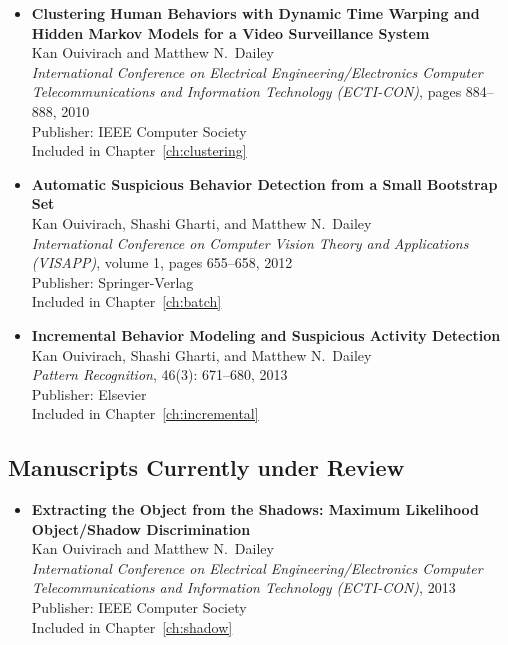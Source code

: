 \begin{itemize}
  \renewcommand\labelitemi{--} 

  \item \textbf{Clustering Human Behaviors with Dynamic Time Warping
    and Hidden Markov Models for a Video Surveillance
    System}\nocite{kan10clustering}\\ Kan Ouivirach and Matthew N.\
    Dailey\\ \textit{International Conference on Electrical
    Engineering/Electronics Computer Telecommunications and
    Information Technology (ECTI-CON)}, pages 884--888, 2010\\
    Publisher: IEEE Computer Society\\ Included in
    Chapter~\ref{ch:clustering}\\

  \item \textbf{Automatic Suspicious Behavior Detection from a Small
    Bootstrap Set}\nocite{kan12detection}\\ Kan Ouivirach, Shashi
    Gharti, and Matthew N.\ Dailey\\ \textit{International Conference
    on Computer Vision Theory and Applications (VISAPP)}, volume 1,
    pages 655--658, 2012\\ Publisher: Springer-Verlag\\ Included in
    Chapter~\ref{ch:batch}\\

  \item \textbf{Incremental Behavior Modeling and Suspicious Activity
    Detection}\nocite{kan13incremental}\\ Kan Ouivirach, Shashi
    Gharti, and Matthew N.\ Dailey\\ \textit{Pattern Recognition},
    46(3): 671--680, 2013\\ Publisher: Elsevier\\ Included in
    Chapter~\ref{ch:incremental}
  
\end{itemize}

\subsection*{Manuscripts Currently under Review}

\begin{itemize}
  \renewcommand\labelitemi{--}

  \item {\bf{Extracting the Object from the Shadows: Maximum
    Likelihood Object/Shadow Discrimination}}\\ Kan Ouivirach and
    Matthew N.\ Dailey\\ \textit{International Conference on
    Electrical Engineering/Electronics Computer Telecommunications and
    Information Technology (ECTI-CON)}, 2013\\ Publisher: IEEE
    Computer Society\\ Included in Chapter~\ref{ch:shadow}

\end{itemize}

